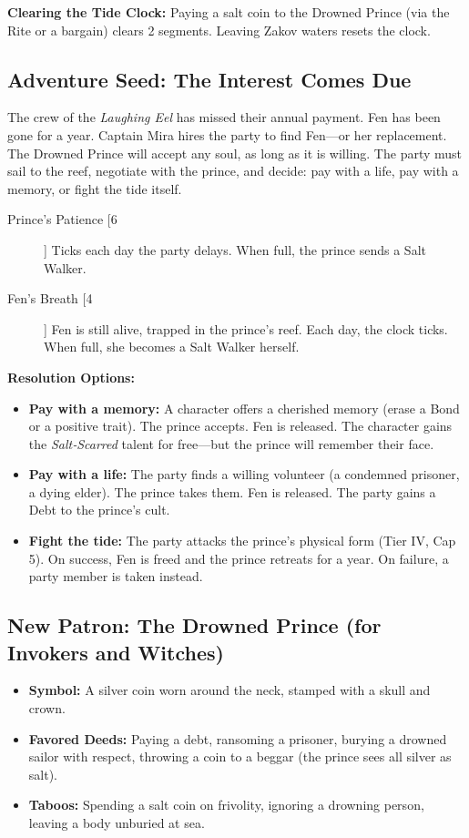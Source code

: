 \documentclass[12pt]{article}
\begin{document}
\textbf{Clearing the Tide Clock:} Paying a salt coin to the Drowned Prince (via the Rite or a bargain) clears 2 segments. Leaving Zakov waters resets the clock.

\subsection{Adventure Seed: The Interest Comes Due}
The crew of the \textit{Laughing Eel} has missed their annual payment. Fen has been gone for a year. Captain Mira hires the party to find Fen—or her replacement. The Drowned Prince will accept any soul, as long as it is willing. The party must sail to the reef, negotiate with the prince, and decide: pay with a life, pay with a memory, or fight the tide itself.

\begin{description}
  \item[Prince’s Patience [6]] Ticks each day the party delays. When full, the prince sends a Salt Walker.
  \item[Fen’s Breath [4]] Fen is still alive, trapped in the prince’s reef. Each day, the clock ticks. When full, she becomes a Salt Walker herself.
\end{description}

\textbf{Resolution Options:}
\begin{itemize}
  \item \textbf{Pay with a memory:} A character offers a cherished memory (erase a Bond or a positive trait). The prince accepts. Fen is released. The character gains the \textit{Salt‑Scarred} talent for free—but the prince will remember their face.
  \item \textbf{Pay with a life:} The party finds a willing volunteer (a condemned prisoner, a dying elder). The prince takes them. Fen is released. The party gains a Debt to the prince’s cult.
  \item \textbf{Fight the tide:} The party attacks the prince’s physical form (Tier IV, Cap 5). On success, Fen is freed and the prince retreats for a year. On failure, a party member is taken instead.
\end{itemize}

\subsection{New Patron: The Drowned Prince (for Invokers and Witches)}
\begin{itemize}
  \item \textbf{Symbol:} A silver coin worn around the neck, stamped with a skull and crown.
  \item \textbf{Favored Deeds:} Paying a debt, ransoming a prisoner, burying a drowned sailor with respect, throwing a coin to a beggar (the prince sees all silver as salt).
  \item \textbf{Taboos:} Spending a salt coin on frivolity, ignoring a drowning person, leaving a body unburied at sea.
\end{itemize}
\end{document}
